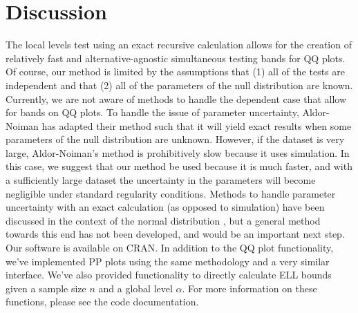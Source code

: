 \documentclass[article]{jss}
\begin{document}
\section{Discussion}
\label{sec:discussion}
The local levels test using an exact recursive calculation allows for the creation of relatively fast and alternative-agnostic simultaneous testing bands for QQ plots. Of course, our method is limited by the assumptions that (1) all of the tests are independent and that (2) all of the parameters of the null distribution are known. Currently, we are not aware of methods to handle the dependent case that allow for bands on QQ plots. To handle the issue of parameter uncertainty, Aldor-Noiman has adapted their method such that it will yield exact results when some parameters of the null distribution are unknown. However, if the dataset is very large, Aldor-Noiman's method is prohibitively slow because it uses simulation. In this case, we suggest that our method be used because it is much faster, and with a sufficiently large dataset the uncertainty in the parameters will become negligible under standard regularity conditions. Methods to handle parameter uncertainty with an exact calculation (as opposed to simulation) have been discussed in the context of the normal distribution \citep{rosenkrantz2000confidence}, but a general method towards this end has not been developed, and would be an important next step.
\newline
\newline
Our software is available on CRAN. In addition to the QQ plot functionality, we've implemented PP plots using the same methodology and a very similar interface. We've also provided functionality to directly calculate ELL bounds given a sample size $n$ and a global level $\alpha$. For more information on these functions, please see the code documentation.


%
\end{document}
